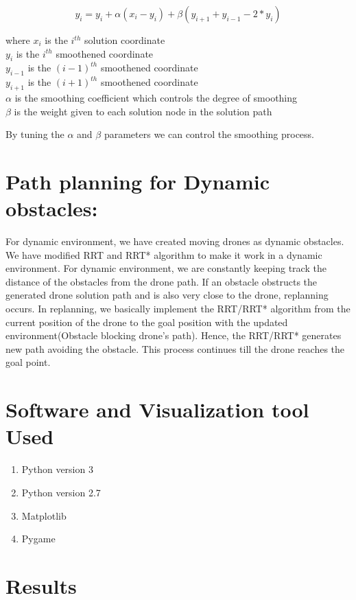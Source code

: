 \documentclass{IEEEtran}
\begin{document}
\begin{enumerate}
\boldmath	
\begin{equation}
y_i = y_i + \alpha(x_i - y_i) + \beta(y_{i+1} + y_{i-1} - 2*y_i)
\end{equation}
\unboldmath
\begin{center}
where $x_i$ is the $i^{th}$ solution coordinate \\
        $y_i$ is the  $i^{th}$ smoothened coordinate \\
	$y_{i-1}$ is the  $(i-1)^{th}$ smoothened coordinate \\
	$y_{i+1}$ is the  $(i+1)^{th}$ smoothened coordinate \\
	$\alpha$ is the smoothing coefficient which controls the degree of smoothing \\
	$\beta$ is the weight given to each solution node in the solution path \\
\end{center}
By tuning the $\alpha$ and $\beta$ parameters we can control the smoothing process.
\end{enumerate}
\section{ \textbf{Path planning for Dynamic obstacles:}}
For dynamic environment, we have created moving drones as dynamic obstacles.
We have modified RRT and RRT* algorithm to make it work in a dynamic environment. 
For dynamic environment, we are constantly keeping track the distance of the obstacles from the drone path. 
If an obstacle obstructs the generated drone solution path and is also very close to the drone, replanning occurs.
In replanning, we basically implement the RRT/RRT* algorithm from the current position of the drone to the goal position with the updated environment(Obstacle blocking drone's path). Hence, the RRT/RRT* generates new path avoiding the obstacle. This process continues till the drone reaches the goal point.
\section{\textbf{Software and Visualization tool Used}}
\begin{enumerate}
\item Python version 3
\item Python version 2.7
\item Matplotlib
\item Pygame
\end{enumerate}
\section{\textbf{Results}}
\end{document}
